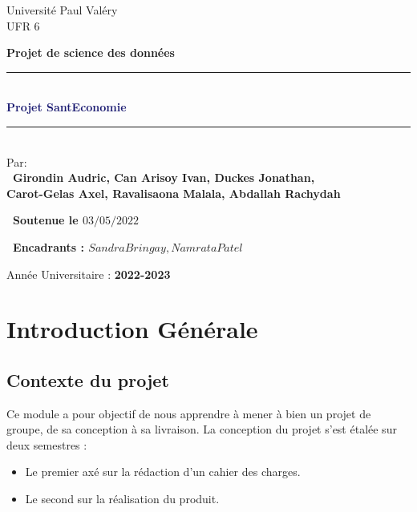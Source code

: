 \documentclass[12pt,a4paper]{report}
\begin{document}
\begin{titlepage}
\begin{center}
\medskip
{\Large{Universit\'{e} Paul Val\'{e}ry }}\\
\textsc{UFR 6}\\
 \vskip0.5cm
  \noindent {\textsc{\LARGE \textcolor{MidnightBlue}{Licence MIASHS}}\\[1cm]}
\end{center}
\vskip0.5cm
\begin{center}
\textbf{Projet de science des donn\'{e}es}\\
\vskip0.5cm
\newcommand{\HRule}{\rule{\linewidth}{0.5mm}} 
	\HRule\\[0.2cm]
	{\huge\bfseries\textcolor{MidnightBlue}{Projet SantEconomie\\[0.2cm]}}
	\HRule\\[1cm]
Par: \\
\small \bf{\ Girondin Audric, Can Arisoy Ivan, Duckes Jonathan, \\ Carot-Gelas Axel, Ravalisaona Malala, Abdallah Rachydah}
\end{center}
  \vspace{3mm}
  \centerline {\small \bf{\ Soutenue le $03/05/2022$}}
  \vspace{3mm}
  \centerline {\small \bf{\ Encadrants : $Sandra Bringay, Namrata Patel$}} 
\vskip2.5cm
\begin{center}
{\small{Année Universitaire : \textbf{2022-2023}}} \\
\end{center}

\end{titlepage}

\newpage
    \tableofcontents %


\chapter{Introduction Générale}
\section{Contexte du projet}
	Ce module a pour objectif de nous apprendre à mener à bien un projet de groupe, de sa conception à sa livraison. La conception du projet s'est étalée sur deux semestres :
\begin{itemize}
    \item Le premier axé sur la rédaction d'un cahier des charges.
    \item Le second sur la réalisation du produit.
\end{itemize}
\end{document}
